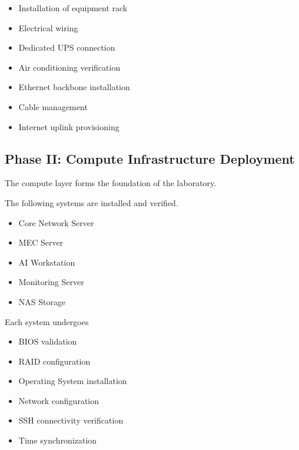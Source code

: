 \documentclass[12pt,a4paper]{article}\usepackage[a4paper,margin=1in]{geometry}\usepackage{graphicx}\usepackage{longtable}\usepackage{booktabs}\usepackage{hyperref}\usepackage{enumitem}\usepackage{amsmath}\usepackage{tikz}\usepackage{pgfgantt}\usepackage{setspace}\setstretch{1.15}\usetikzlibrary{positioning,arrows.meta,shapes.geometric}
\begin{document}
	\begin{itemize}
		
		\item Installation of equipment rack
		
		\item Electrical wiring
		
		\item Dedicated UPS connection
		
		\item Air conditioning verification
		
		\item Ethernet backbone installation
		
		\item Cable management
		
		\item Internet uplink provisioning
		
	\end{itemize}
	
	
	\subsection{Phase II: Compute Infrastructure Deployment}
	
	The compute layer forms the foundation of the laboratory.
	
	The following systems are installed and verified.
	
	\begin{itemize}
		
		\item Core Network Server
		
		\item MEC Server
		
		\item AI Workstation
		
		\item Monitoring Server
		
		\item NAS Storage
		
	\end{itemize}
	
	Each system undergoes
	
	\begin{itemize}
		
		\item BIOS validation
		
		\item RAID configuration
		
		\item Operating System installation
		
		\item Network configuration
		
		\item SSH connectivity verification
		
		\item Time synchronization
		
	\end{itemize}
	
\end{document}
